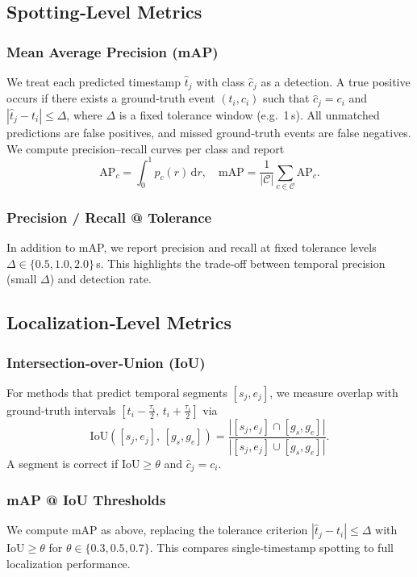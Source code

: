 \subsection{Spotting‑Level Metrics}
\subsubsection{Mean Average Precision (mAP)}
We treat each predicted timestamp $\hat t_j$ with class $\hat c_j$ as a detection. A true positive occurs if there exists a ground‑truth event $(t_i,c_i)$ such that $\hat c_j = c_i$ and $|\hat t_j - t_i|\le\Delta$, where $\Delta$ is a fixed tolerance window (e.g.\ 1\,s). All unmatched predictions are false positives, and missed ground‑truth events are false negatives. We compute precision–recall curves per class and report
\[
\mathrm{AP}_c = \int_{0}^{1} p_c(r)\,\mathrm{d}r,\quad
\mathrm{mAP} = \frac{1}{|\mathcal{C}|}\sum_{c\in\mathcal{C}}\mathrm{AP}_c.
\]

\subsubsection{Precision / Recall @ Tolerance}
In addition to mAP, we report precision and recall at fixed tolerance levels $\Delta\in\{0.5,1.0,2.0\}$\,s. This highlights the trade‑off between temporal precision (small $\Delta$) and detection rate.

\subsection{Localization‑Level Metrics}
\subsubsection{Intersection‑over‑Union (IoU)}
For methods that predict temporal segments $[s_j,e_j]$, we measure overlap with ground‑truth intervals $[t_i-\tfrac{\tau_i}{2},\,t_i+\tfrac{\tau_i}{2}]$ via
\[
\mathrm{IoU}([s_j,e_j],\,[g_s,g_e]) 
= \frac{|[s_j,e_j]\cap [g_s,g_e]|}{|[s_j,e_j]\cup [g_s,g_e]|}.
\]
A segment is correct if $\mathrm{IoU}\!\ge\theta$ and $\hat c_j=c_i$.

\subsubsection{mAP @ IoU Thresholds}
We compute mAP as above, replacing the tolerance criterion $|\hat t_j - t_i|\le\Delta$ with $\mathrm{IoU}\ge\theta$ for $\theta\in\{0.3,0.5,0.7\}$. This compares single‑timestamp spotting to full localization performance.

